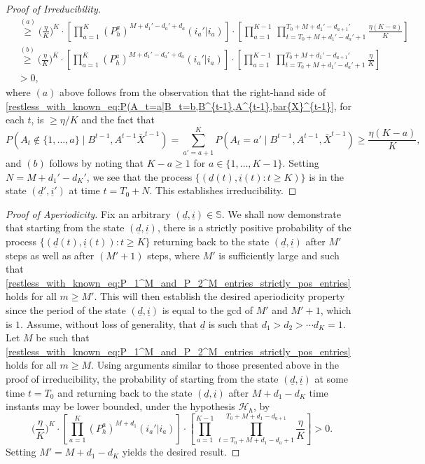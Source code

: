 \begin{proof}[Proof of Irreducibility]
\begin{align}
	&\stackrel{(a)}{\geq}\bigg(\frac{\eta}{K}\bigg)^{K}\cdot  \left[\prod\limits_{a=1}^{K}(P_h^a)^{M+d_1'-d_a'+d_a}(i_a'|i_a)\right]\cdot \left[\prod\limits_{a=1}^{K-1}\,\prod\limits_{t=T_0+M+d_1'-d_a'+1}^{T_0+M+d_1'-d_{a+1}'}\frac{\eta(K-a)}{K}\right]\nonumber\\
	&\stackrel{(b)}{\geq} \bigg(\frac{\eta}{K}\bigg)^{K}\cdot \left[\prod\limits_{a=1}^{K}(P_h^a)^{M+d_1'-d_a'+d_a}(i_a'|i_a)\right]\cdot \left[\prod\limits_{a=1}^{K-1}\,\prod\limits_{t=T_0+M+d_1'-d_a'+1}^{T_0+M+d_1'-d_{a+1}'}\frac{\eta}{K}\right]\nonumber\\
	&>0,
\end{align}
where $(a)$ above follows from the observation that the right-hand side of \eqref{restless_with_known_eq:P(A_t=a|B_t=b,B^{t-1},A^{t-1},bar{X}^{t-1}}, for each $t$, is $\geq \eta/K$ and the fact that $$P(A_t\notin \{1,\ldots,a\}\mid B^{t-1},A^{t-1}\bar{X}^{t-1})=\sum\limits_{a'= a+1}^{K} P(A_t=a'\mid B^{t-1},A^{t-1},\bar{X}^{t-1})\geq \frac{\eta(K-a)}{K},$$ and $(b)$ follows by noting that $K-a\geq 1$ for $a\in \{1,\ldots,K-1\}$. Setting $N=M+d_1'-d_K'$, we see that the process $\{(\underline{d}(t),\underline{i}(t):t\geq K)\}$ is in the state $(\underline{d}',\underline{i}')$ at time $t=T_0+N$. This establishes irreducibility.
\end{proof}

\begin{proof}[Proof of Aperiodicity]
	Fix an arbitrary $(\underline{d},\underline{i})\in\mathbb{S}$. We shall now demonstrate that starting from the state $(\underline{d},\underline{i})$, there is a strictly positive probability of the process $\{(\underline{d}(t),\underline{i}(t)):t\geq K\}$ returning back to the state $(\underline{d},\underline{i})$ after $M'$ steps as well as after $(M'+1)$ steps, where $M'$ is  sufficiently large and such that \eqref{restless_with_known_eq:P_1^M_and_P_2^M_entries_strictly_pos_entries} holds for all $m\geq M'$. This will then establish the desired aperiodicity property since the period of the state $(\underline{d},\underline{i})$ is equal to the gcd of $M'$ and $M'+1$, which is $1$.  Assume, without loss of generality, that $\underline{d}$ is such that $d_1>d_2>\cdots d_K=1$. Let $M$ be such that \eqref{restless_with_known_eq:P_1^M_and_P_2^M_entries_strictly_pos_entries} holds for all $m\geq M$. Using arguments similar to those presented above in the proof of irreducibility, the probability of starting from the state $(\underline{d},\underline{i})$ at some time $t=T_0$ and returning back to the state $(\underline{d},\underline{i})$ after $M+d_1-d_K$ time instants may be lower bounded, under the hypothesis $\mathcal{H}_h$, by 
	\begin{equation}
		\bigg(\frac{\eta}{K}\bigg)^{K}\cdot \left[\prod\limits_{a=1}^{K}(P_h^a)^{M+d_1}(i_a'|i_a)\right]\cdot \left[\prod\limits_{a=1}^{K-1}\,\prod\limits_{t=T_0+M+d_1-d_a+1}^{T_0+M+d_1-d_{a+1}}\frac{\eta}{K}\right]>0.\label{restless_with_known_eq:aperiodicity}
	\end{equation}  
Setting $M'=M+d_1-d_K$ yields the desired result. 
\end{proof}


